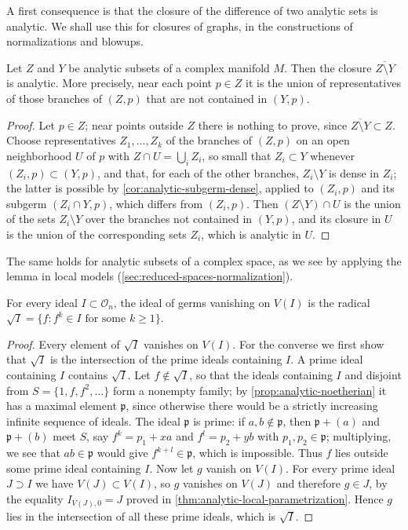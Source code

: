 A first consequence is that the closure of the difference of two analytic sets is analytic. We shall use this for closures of graphs, in the constructions of normalizations and blowups.

\begin{lemma}\label{lem:analytic-closure-complement}
Let $Z$ and $Y$ be analytic subsets of a complex manifold $M$. Then the closure $\overline{Z\setminus Y}$ is analytic. More precisely, near each point $p\in Z$ it is the union of representatives of those branches of $(Z,p)$ that are not contained in $(Y,p)$.
\end{lemma}
\begin{proof}
Let $p\in Z$; near points outside $Z$ there is nothing to prove, since $\overline{Z\setminus Y}\subset Z$. Choose representatives $Z_1,\ldots,Z_k$ of the branches of $(Z,p)$ on an open neighborhood $U$ of $p$ with $Z\cap U=\bigcup_iZ_i$, so small that $Z_i\subset Y$ whenever $(Z_i,p)\subset(Y,p)$, and that, for each of the other branches, $Z_i\setminus Y$ is dense in $Z_i$; the latter is possible by \cref{cor:analytic-subgerm-dense}, applied to $(Z_i,p)$ and its subgerm $(Z_i\cap Y,p)$, which differs from $(Z_i,p)$. Then $(Z\setminus Y)\cap U$ is the union of the sets $Z_i\setminus Y$ over the branches not contained in $(Y,p)$, and its closure in $U$ is the union of the corresponding sets $Z_i$, which is analytic in $U$.
\end{proof}

The same holds for analytic subsets of a complex space, as we see by applying the lemma in local models (\cref{sec:reduced-spaces-normalization}).

\begin{corollary}\label{cor:analytic-nullstellensatz}
For every ideal $I\subset\mathcal O_n$, the ideal of germs vanishing on $V(I)$ is the radical $\sqrt I=\{f:f^k\in I\text{ for some }k\ge1\}$.
\end{corollary}
\begin{proof}
Every element of $\sqrt I$ vanishes on $V(I)$. For the converse we first show that $\sqrt I$ is the intersection of the prime ideals containing $I$. A prime ideal containing $I$ contains $\sqrt I$. Let $f\notin\sqrt I$, so that the ideals containing $I$ and disjoint from $S=\{1,f,f^2,\ldots\}$ form a nonempty family; by \cref{prop:analytic-noetherian} it has a maximal element $\mathfrak p$, since otherwise there would be a strictly increasing infinite sequence of ideals. The ideal $\mathfrak p$ is prime: if $a,b\notin\mathfrak p$, then $\mathfrak p+(a)$ and $\mathfrak p+(b)$ meet $S$, say $f^k=p_1+xa$ and $f^l=p_2+yb$ with $p_1,p_2\in\mathfrak p$; multiplying, we see that $ab\in\mathfrak p$ would give $f^{k+l}\in\mathfrak p$, which is impossible. Thus $f$ lies outside some prime ideal containing $I$. Now let $g$ vanish on $V(I)$. For every prime ideal $J\supset I$ we have $V(J)\subset V(I)$, so $g$ vanishes on $V(J)$ and therefore $g\in J$, by the equality $I_{V(J),0}=J$ proved in \cref{thm:analytic-local-parametrization}. Hence $g$ lies in the intersection of all these prime ideals, which is $\sqrt I$.
\end{proof}

